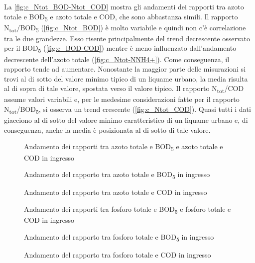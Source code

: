 La \autoref{fig:c_Ntot_BOD-Ntot_COD} mostra  gli andamenti dei rapporti tra azoto totale e BOD\textsubscript{5} e azoto totale e COD, che sono abbastanza simili.
Il rapporto N\textsubscript{tot}/BOD\textsubscript{5} (\autoref{fig:c_Ntot_BOD}) è molto variabile e quindi non c’è correlazione tra le due grandezze. Esso risente principalmente del trend decrescente osservato per il BOD\textsubscript{5} (\autoref{fig:c_BOD-COD}) mentre è meno influenzato dall’andamento decrescente dell’azoto totale (\autoref{fig:c_Ntot-NNH4+}). Come conseguenza, il rapporto tende ad aumentare. Nonostante la maggior parte delle misurazioni si trovi al di sotto del valore minimo tipico di un liquame urbano, la media risulta al di sopra di tale valore, spostata verso il valore tipico.
Il rapporto N\textsubscript{tot}/COD assume valori variabili e, per le medesime considerazioni fatte per il rapporto N\textsubscript{tot}/BOD\textsubscript{5}, si osserva un trend crescente (\autoref{fig:c_Ntot_COD}). Quasi tutti i dati giacciono al di sotto del valore minimo caratteristico di un liquame urbano e, di conseguenza, anche la media è posizionata al di sotto di tale valore.

\begin{figure}[H]
		\centering
	\caption{Andamento dei rapporti tra azoto totale e BOD\textsubscript{5} e azoto totale e COD in ingresso}
	\label{fig:c_Ntot_BOD-Ntot_COD}
\end{figure}
\begin{figure}[H]
		\centering
	\caption{Andamento del rapporto tra azoto totale e BOD\textsubscript{5} in ingresso}
	\label{fig:c_Ntot_BOD}
\end{figure}
\begin{figure}[H]
		\centering
	\caption{Andamento del rapporto tra azoto totale e COD in ingresso}
	\label{fig:c_Ntot_COD}
\end{figure}
\begin{figure}[H]
		\centering
	\caption{Andamento dei rapporti tra fosforo totale e BOD\textsubscript{5} e fosforo totale e COD in ingresso}
	\label{fig:c_Ptot_BOD-Ptot_COD}
\end{figure}
\begin{figure}[H]
		\centering
	\caption{Andamento del rapporto tra fosforo totale e BOD\textsubscript{5} in ingresso}
	\label{fig:c_Ptot_BOD}
\end{figure}
\begin{figure}[H]
		\centering
	\caption{Andamento del rapporto tra fosforo totale e COD in ingresso}
	\label{fig:c_Ptot_COD}
\end{figure}

